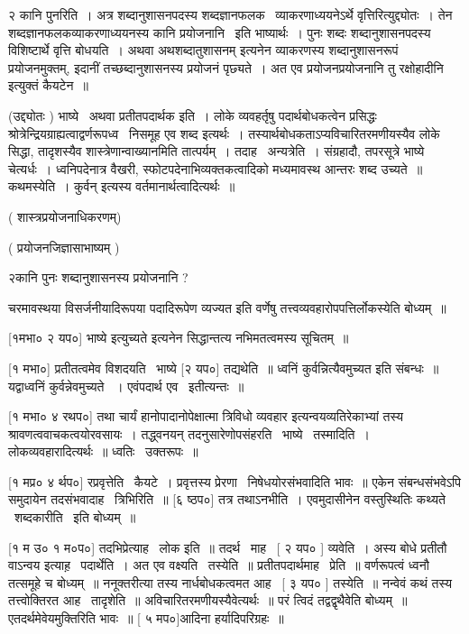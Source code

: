\documentclass[11pt, openany]{book}
\begin{document}
२ कानि पुनरिति~। अत्र शब्दानुशासनपदस्य शब्दज्ञानफलक \textendash\ 
व्याकरणाध्ययनेऽर्थे वृत्तिरित्युद्द्योतः~। तेन
शब्दज्ञानफलकव्याकरणाध्ययनस्य कानि प्रयोजनानि \textendash\ इति भाष्यार्थः~। पुनः शब्दः
शब्दानुशासनपदस्य विशिष्टार्थे वृत्ति बोधयति~। अथवा अथशब्दातुशासनम्
इत्यनेन व्याकरणस्य शब्दानुशासनरूपं प्रयोजनमुक्तम्, इदानीं
तच्छब्दानुशासनस्य प्रयोजनं पृछ्यते~। अत एव {\qt प्रयोजनप्रयोजनानि तु
रक्षोहादीनि} इत्युक्तं कैयटेन~॥ 





 (उद्द्योतः ) भाष्ये \textendash\ अथवा प्रतीतपदार्थक इति~। लोके व्यवहर्तृषु
पदार्थबोधकत्वेन प्रसिद्धः श्रोत्रेन्द्रियग्राह्यत्वाद्वर्णरूपध्व \textendash\ निसमूह
एव शब्द इत्यर्थः~। तस्यार्थबोधकताऽप्यविचारितरमणीयस्यैव लोके सिद्धा,
तादृशस्यैव शास्त्रेणान्वाख्यानमिति तात्पर्यम्~। तदाह \textendash\ अन्यत्रेति~। 
संग्रहादौ, तपरसूत्रे भाष्ये चेत्यर्धः~। ध्वनिपदेनात्र वैखरी,
स्फोटपदेनाभिव्यक्तकत्वादिको मध्यमावस्थ आन्तरः शब्द उच्यते~॥ कथमस्येति~। 
कुर्वन् इत्यस्य वर्तमानार्थत्वादित्यर्थः~॥ 

 ( शास्त्रप्रयोजनाधिकरणम्) 

 ( प्रयोजनजिज्ञासाभाष्यम् ) 

 २कानि पुनः शब्दानुशासनस्य प्रयोजनानि ? 



चरमावस्थया विसर्जनीयादिरूपया पदादिरूपेण व्यज्यत इति वर्णेषु
तत्त्वव्यवहारोपपत्तिर्लोकस्येति बोध्यम्~॥ 

 [१मभा० २ यप०] भाष्ये {\qt इत्युच्यते} इत्यनेन सिद्धान्तत्य
नभिमतत्वमस्य सूचितम्~॥ 

 [१ मभा०] प्रतीतत्वमेव विशदयति \textendash\ भाष्ये [२ यप०] तद्यथेति~॥
ध्वनिं कुर्वन्नित्यैवमुच्यत इति संबन्धः~॥ यद्वाध्वनिं कुर्वन्नेवमुच्यते
~। एवंपदार्थ एव \textendash\ इतीत्यन्तः~॥ 

 [१ मभा० ४ रथप०] तथा चार्यं हानोपादानोपेक्षात्मा त्रिविधो व्यवहार
इत्यन्वयव्यतिरेकाभ्यां तस्य श्रावणत्ववाचकत्वयोरवसायः~। तद्ध्वनयन्
तदनुसारेणोपसंहरति \textendash\ भाष्ये \textendash\ तस्मादिति~। लोकव्यवहारादित्यर्थः~॥
ध्वतिः \textendash\ उक्तरूपः~॥ 

 [१ मप्र० ४ र्थप०] रप्रवृत्तेति \textendash\ कैयटे~। प्रवृत्तस्य प्रेरणा \textendash\ 
निषेधयोरसंभवादिति भावः~॥ एकेन संबन्धसंभवेऽपि समुदायेन
तदसंभवादाह \textendash\ त्रिभिरिति~॥ [६ ष्ठप०] तत्र तथाऽनभीति~। एवमुदासीनेन
वस्तुस्थितिः कथ्यते \textendash\ शब्दकारीति \textendash\ इति बोध्यम्~॥ 

 [१ म उ० १ म०प०] तदभिप्रेत्याह \textendash\ लोक इति~॥ तदर्थ \textendash\ माह \textendash\ [ २ यप० ]
व्यवेति~। अस्य बोधे प्रतीतौ वाऽन्वय इत्याह़ \textendash\ पदार्थेति~। अत एव
वक्ष्यति \textendash\ तस्येति~॥ प्रतीतपदार्थमाह \textendash\ प्रेति~॥ वर्णरूपत्वं ध्वनौ
तत्समूहे च बोध्यम्~॥ ननूक्तरीत्या तस्य नार्धबोधकत्वमत आह \textendash\ [ ३ यप० ]
तस्येति~॥ नन्वेवं कथं तस्य तत्त्वोक्तिरत आह \textendash\ तादृशेति~॥
अविचारितरमणीयस्यैवेत्यर्थः~॥ परं त्विदं तद्वद्वृथैवेति बोध्यम्~॥
एतदर्थमेवेयमुक्तिरिति भावः~॥ [ ५ मप०]आदिना हर्यादिपरिग्रहः~॥ 
\end{document}
